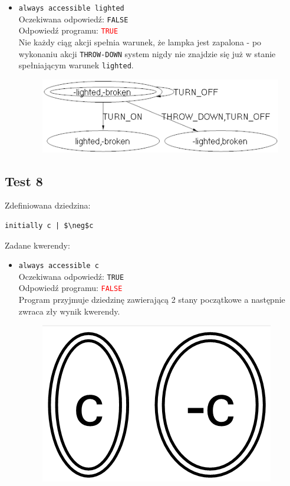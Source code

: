 \documentclass{article}
\begin{document}
\begin{itemize}
	\item {\large\texttt{always accessible lighted}}\\
	Oczekiwana odpowiedź: \texttt{FALSE}\\
	Odpowiedź programu: \textcolor{red}{\texttt{TRUE}}\\
    Nie każdy ciąg akcji spełnia warunek, że lampka jest zapalona - po wykonaniu akcji \texttt{THROW-DOWN} system nigdy nie znajdzie się już w stanie spełniającym warunek \texttt{lighted}.
    \begin{figure}[H]
    \centering
    \includegraphics[scale=0.5]{7_3}
    \end{figure}

\end{itemize}


\newpage
\subsection{Test 8}
Zdefiniowana dziedzina:
\bigskip
{}
\begin{lstlisting}[mathescape=true]
initially c | $\neg$c
\end{lstlisting}
\vspace{1cm}
Zadane kwerendy:
\begin{itemize}
	\item {\large\texttt{always accessible c}}\\
	Oczekiwana odpowiedź: \texttt{TRUE}\\
	Odpowiedź programu: \textcolor{red}{\texttt{FALSE}}\\
	Program przyjmuje dziedzinę zawierającą 2 stany początkowe a następnie zwraca zły wynik kwerendy.
	\begin{figure}[H]
		\centering
		\includegraphics[scale=0.3]{c3}
	\end{figure}
\end{itemize}
\newpage
\end{document}
